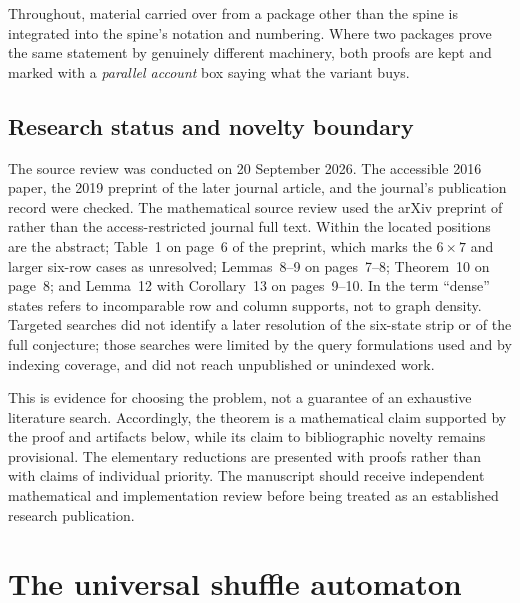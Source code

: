 \documentclass[11pt,letterpaper]{article}
\numberwithin{equation}{section}
\theoremstyle{definition}
\theoremstyle{remark}
\begin{document}
Throughout, material carried over from a package other than the spine is
integrated into the spine's notation and numbering. Where two packages prove
the same statement by genuinely different machinery, both proofs are kept and
marked with a \emph{parallel account} box saying what the variant buys.

\subsection{Research status and novelty boundary}
The source review was conducted on 20 September 2026. The accessible 2016
paper, the 2019 preprint of the later journal article, and the journal's
publication record were checked. The mathematical source review used the
arXiv preprint of \cite{CLP2020} rather than the access-restricted journal
full text. Within \cite{BJLRS2016} the located positions are the abstract;
Table~1 on page~6 of the preprint, which marks the $6\times7$ and larger
six-row cases as unresolved; Lemmas~8--9 on pages~7--8; Theorem~10 on page~8;
and Lemma~12 with Corollary~13 on pages~9--10. In \cite{CLP2020} the term
``dense'' states refers to incomparable row and column supports, not to graph
density. Targeted searches did not identify a later resolution of the
six-state strip or of the full conjecture; those searches were limited by the
query formulations used and by indexing coverage, and did not reach
unpublished or unindexed work.

This is evidence for choosing the problem, not a guarantee of an exhaustive
literature search. Accordingly, the theorem is a mathematical claim supported
by the proof and artifacts below, while its claim to bibliographic novelty
remains provisional. The elementary reductions are presented with proofs
rather than with claims of individual priority. The manuscript should receive
independent mathematical and implementation review before being treated as an
established research publication.

\section{The universal shuffle automaton}
\label{sec:automata}
\end{document}
